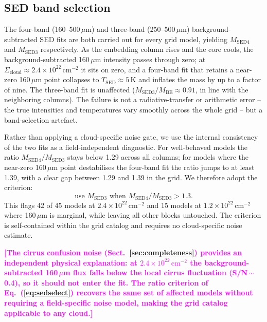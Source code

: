 \documentclass[11pt,a4paper]{article}
\newcommand{\note}[1]{\textcolor{magenta}{\textbf{[#1]}}}
\newcommand{\Scloud}{\Sigma_{\mathrm{cloud}}}
\newcommand{\Tsed}{T_{\mathrm{SED}}}
\begin{document}
\subsection{SED band selection}
\label{sec:bandselect}

The four-band (160--500\,$\mu$m) and three-band (250--500\,$\mu$m)
background-subtracted SED fits are both carried out for every grid model, yielding
$M_{\mathrm{SED4}}$ and $M_{\mathrm{SED3}}$ respectively. As the embedding
column rises and the core cools, the background-subtracted 160\,$\mu$m
intensity passes through zero; at $\Scloud\approx2.4\times10^{22}\,
\mathrm{cm^{-2}}$ it sits on zero, and a four-band fit that retains a
near-zero 160\,$\mu$m point collapses to $\Tsed\approx5$\,K and inflates the
mass by up to a factor of nine. The three-band fit is unaffected
($M_{\mathrm{SED3}}/M_{\mathrm{BE}}\approx0.91$, in line with the
neighboring columns). The failure is not a radiative-transfer or arithmetic
error -- the true intensities and temperatures vary smoothly across the whole
grid -- but a band-selection artefact.

Rather than applying a cloud-specific noise gate, we use the internal
consistency of the two fits as a field-independent diagnostic. For well-behaved
models the ratio $M_{\mathrm{SED4}}/M_{\mathrm{SED3}}$ stays below 1.29
across all columns; for models where the near-zero 160\,$\mu$m point
destabilises the four-band fit the ratio jumps to at least 1.39, with a
clear gap between 1.29 and 1.39 in the grid. We therefore adopt the criterion:
\begin{equation}
  \text{use } M_{\mathrm{SED3}} \text{ when }
  M_{\mathrm{SED4}}/M_{\mathrm{SED3}} > 1.3.
  \label{eq:sedselect}
\end{equation}
This flags 42 of 45 models at $2.4\times10^{22}\,\mathrm{cm^{-2}}$ and 15
models at $1.2\times10^{22}\,\mathrm{cm^{-2}}$ where 160\,$\mu$m is
marginal, while leaving all other blocks untouched. The criterion is
self-contained within the grid catalog and requires no cloud-specific noise
estimate.

\note{The cirrus confusion noise (Sect.~\ref{sec:completeness}) provides an
independent physical explanation: at $2.4\times10^{22}\,\mathrm{cm^{-2}}$
the background-subtracted 160\,$\mu$m flux falls below the local cirrus
fluctuation (S/N\,$\sim$0.4), so it should not enter the fit. The ratio
criterion of Eq.~(\ref{eq:sedselect}) recovers the same set of affected
models without requiring a field-specific noise model, making the grid
catalog applicable to any cloud.}
\end{document}
